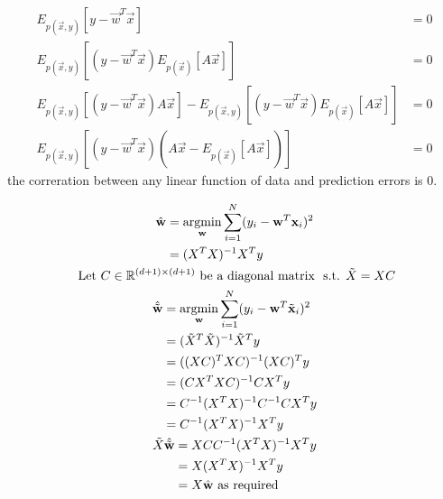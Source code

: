 \documentclass{introtosml}
\newcommand\Ep[1]{E_{p(\vec{x}, y)} \left[ #1 \right]}
\begin{document}
\begin{p}
  \item
    \begin{align*}
      \Ep{y - \vec{w}^T \vec{x}} & = 0 \\
      \Ep{(y - \vec{w}^T \vec{x}) E_{p(\vec{x})} \left[ A \vec{x} \right]} & = 0 \\
      \Ep{(y - \vec{w}^T \vec{x}) A \vec{x}}
          - \Ep{(y - \vec{w}^T \vec{x}) E_{p(\vec{x})} \left[ A \vec{x} \right]} & = 0 \\
      \Ep{(y - \vec{w}^T \vec{x}) (A \vec{x} - E_{p(\vec{x})} \left[ A \vec{x} \right])} & = 0
    \end{align*}
    \therefore the correration between any linear function of data and prediction errors is 0.

  \item
    \begin{gather*}
      \begin{aligned}
        \hat{\vec{w}}
        & = \argmin_\vec{w} \sum_{i=1}^N (y_i - \vec{w}^T \vec{x}_i)^2 \\
        & = (X^T X)^{-1} X^T y
      \end{aligned} \\
      \text{Let} C \in \field{R}^{(d+1) \times (d+1)} \text{be a diagonal matrix}
          \st \tilde{X} = XC \\
      \begin{aligned}
        \hat{\tilde{\vec{w}}}
        & = \argmin_\vec{w} \sum_{i=1}^N (y_i - \vec{w}^T \tilde{\vec{x}}_i)^2 \\
        & = (\tilde{X}^T \tilde{X})^{-1} \tilde{X}^T y \\
        & = ((XC)^T XC)^{-1} (XC)^T y \\
        & = (CX^T XC)^{-1} CX^T y \\
        & = C^{-1} (X^T X)^{-1} C^{-1} CX^T y \\
        & = C^{-1} (X^T X)^{-1} X^T y
      \end{aligned} \\
      \begin{aligned}
        \tilde{X}\hat{\tilde{\vec{w}}}
        & = XCC^{-1} (X^T X)^{-1} X^T y \\
        & = X (X^T X)^{-1} X^T y \\
        & = X \hat{\vec{w}} \text{as required}
      \end{aligned}
    \end{gather*}


\end{p}
\end{document}
